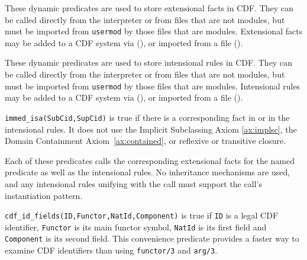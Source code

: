\begin{description}

%
These dynamic predicates are used to store extensional facts in CDF.
They can be called directly from the interpreter or from files that
are not modules, but must be imported from {\tt usermod} by those
files that are modules.  Extensional facts may be added to a CDF system
via  (), or imported from a
 file ().

%
These dynamic predicates are used to store intensional rules in CDF.
They can be called directly from the interpreter or from files that
are not modules, but must be imported from {\tt usermod} by those
files that are modules.  Intensional rules may be added to a CDF
system via  (), or imported from
a  file ().


{\tt immed\_isa(SubCid,SupCid)} is true if there is a corresponding
fact in  or in the intensional rules.  It does not
use the Implicit Subclassing Axiom \ref{ax:implsc}, the Domain
Containment Axiom~\ref{ax:contained}, or reflexive or transitive
closure.

Each of these predicates calls the corresponding extensional facts for
the named predicate as well as the intensional rules.  No inheritance
mechanisms are used, and any intensional rules unifying with the call
must support the call's instantiation pattern.


{\tt cdf\_id\_fields(ID,Functor,NatId,Component)} is true if {\tt ID}
is a legal CDF identifier, {\tt Functor} is its main functor symbol,
{\tt NatId} is its first field and {\tt Component} is its second
field.  This convenience predicate provides a faster way to examine
CDF identifiers than using {\tt functor/3} and {\tt arg/3}.

\end{description}
